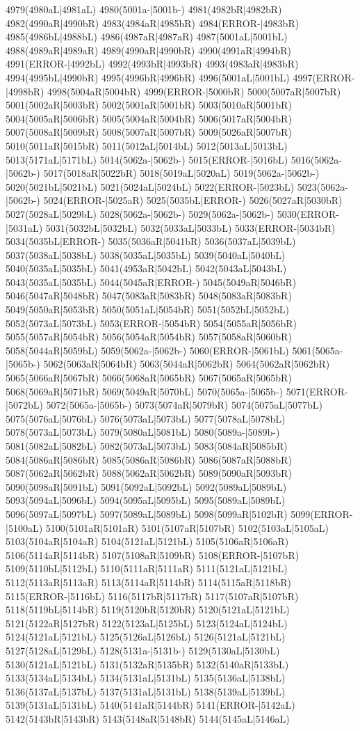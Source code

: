4979(4980aL|4981aL) 4980(5001a-|5001b-) 4981(4982bR|4982bR) 4982(4990aR|4990bR) 4983(4984aR|4985bR) 4984(ERROR-|4983bR) 4985(4986bL|4988bL) 4986(4987aR|4987aR) 4987(5001aL|5001bL) 4988(4989aR|4989aR) 4989(4990aR|4990bR) 4990(4991aR|4994bR) 4991(ERROR-|4992bL) 4992(4993bR|4993bR) 4993(4983aR|4983bR) 4994(4995bL|4990bR) 4995(4996bR|4996bR) 4996(5001aL|5001bL) 4997(ERROR-|4998bR) 4998(5004aR|5004bR) 4999(ERROR-|5000bR) 5000(5007aR|5007bR) 5001(5002aR|5003bR) 5002(5001aR|5001bR) 5003(5010aR|5001bR) 5004(5005aR|5006bR) 5005(5004aR|5004bR) 5006(5017aR|5004bR) 5007(5008aR|5009bR) 5008(5007aR|5007bR) 5009(5026aR|5007bR) 5010(5011aR|5015bR) 5011(5012aL|5014bL) 5012(5013aL|5013bL) 5013(5171aL|5171bL) 5014(5062a-|5062b-) 5015(ERROR-|5016bL) 5016(5062a-|5062b-) 5017(5018aR|5022bR) 5018(5019aL|5020aL) 5019(5062a-|5062b-) 5020(5021bL|5021bL) 5021(5024aL|5024bL) 5022(ERROR-|5023bL) 5023(5062a-|5062b-) 5024(ERROR-|5025aR) 5025(5035bL|ERROR-) 5026(5027aR|5030bR) 5027(5028aL|5029bL) 5028(5062a-|5062b-) 5029(5062a-|5062b-) 5030(ERROR-|5031aL) 5031(5032bL|5032bL) 5032(5033aL|5033bL) 5033(ERROR-|5034bR) 5034(5035bL|ERROR-) 5035(5036aR|5041bR) 5036(5037aL|5039bL) 5037(5038aL|5038bL) 5038(5035aL|5035bL) 5039(5040aL|5040bL) 5040(5035aL|5035bL) 5041(4953aR|5042bL) 5042(5043aL|5043bL) 5043(5035aL|5035bL) 5044(5045aR|ERROR-) 5045(5049aR|5046bR) 5046(5047aR|5048bR) 5047(5083aR|5083bR) 5048(5083aR|5083bR) 5049(5050aR|5053bR) 5050(5051aL|5054bR) 5051(5052bL|5052bL) 5052(5073aL|5073bL) 5053(ERROR-|5054bR) 5054(5055aR|5056bR) 5055(5057aR|5054bR) 5056(5054aR|5054bR) 5057(5058aR|5060bR) 5058(5044aR|5059bL) 5059(5062a-|5062b-) 5060(ERROR-|5061bL) 5061(5065a-|5065b-) 5062(5063aR|5064bR) 5063(5044aR|5062bR) 5064(5062aR|5062bR) 5065(5066aR|5067bR) 5066(5068aR|5065bR) 5067(5065aR|5065bR) 5068(5069aR|5071bR) 5069(5049aR|5070bL) 5070(5065a-|5065b-) 5071(ERROR-|5072bL) 5072(5065a-|5065b-) 5073(5074aR|5079bR) 5074(5075aL|5077bL) 5075(5076aL|5076bL) 5076(5073aL|5073bL) 5077(5078aL|5078bL) 5078(5073aL|5073bL) 5079(5080aL|5081bL) 5080(5089a-|5089b-) 5081(5082aL|5082bL) 5082(5073aL|5073bL) 5083(5084aR|5085bR) 5084(5086aR|5086bR) 5085(5086aR|5086bR) 5086(5087aR|5088bR) 5087(5062aR|5062bR) 5088(5062aR|5062bR) 5089(5090aR|5093bR) 5090(5098aR|5091bL) 5091(5092aL|5092bL) 5092(5089aL|5089bL) 5093(5094aL|5096bL) 5094(5095aL|5095bL) 5095(5089aL|5089bL) 5096(5097aL|5097bL) 5097(5089aL|5089bL) 5098(5099aR|5102bR) 5099(ERROR-|5100aL) 5100(5101aR|5101aR) 5101(5107aR|5107bR) 5102(5103aL|5105aL) 5103(5104aR|5104aR) 5104(5121aL|5121bL) 5105(5106aR|5106aR) 5106(5114aR|5114bR) 5107(5108aR|5109bR) 5108(ERROR-|5107bR) 5109(5110bL|5112bL) 5110(5111aR|5111aR) 5111(5121aL|5121bL) 5112(5113aR|5113aR) 5113(5114aR|5114bR) 5114(5115aR|5118bR) 5115(ERROR-|5116bL) 5116(5117bR|5117bR) 5117(5107aR|5107bR) 5118(5119bL|5114bR) 5119(5120bR|5120bR) 5120(5121aL|5121bL) 5121(5122aR|5127bR) 5122(5123aL|5125bL) 5123(5124aL|5124bL) 5124(5121aL|5121bL) 5125(5126aL|5126bL) 5126(5121aL|5121bL) 5127(5128aL|5129bL) 5128(5131a-|5131b-) 5129(5130aL|5130bL) 5130(5121aL|5121bL) 5131(5132aR|5135bR) 5132(5140aR|5133bL) 5133(5134aL|5134bL) 5134(5131aL|5131bL) 5135(5136aL|5138bL) 5136(5137aL|5137bL) 5137(5131aL|5131bL) 5138(5139aL|5139bL) 5139(5131aL|5131bL) 5140(5141aR|5144bR) 5141(ERROR-|5142aL) 5142(5143bR|5143bR) 5143(5148aR|5148bR) 5144(5145aL|5146aL) 